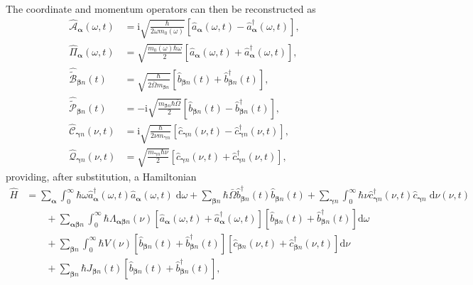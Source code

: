 \documentclass{article}
\begin{document}
The coordinate and momentum operators can then be reconstructed as
\begin{equation}
\begin{split}
\hat{\mathcal{A}}_{\bm{\alpha}}(\omega,t) &= \mathrm{i}\sqrt{\frac{\hbar}{2\omega m_0(\omega)}}\left[\hat{a}_{\bm{\alpha}}(\omega,t) - \hat{a}_{\bm{\alpha}}^\dagger(\omega,t)\right],\\
\hat{\mathit{\Pi}}_{\bm{\alpha}}(\omega,t) &= \sqrt{\frac{m_0(\omega)\hbar\omega}{2}}\left[\hat{a}_{\bm{\alpha}}(\omega,t) + \hat{a}_{\bm{\alpha}}^\dagger(\omega,t)\right],\\[0.5em]
\hat{\tilde{\mathcal{B}}}_{\bm{\beta}n}(t) &= \sqrt{\frac{\hbar}{2\bar{\Omega}m_{\bm{\beta}n}}}\left[\hat{b}_{\bm{\beta}n}(t) + \hat{b}_{\bm{\beta}n}^\dagger(t)\right],\\
\hat{\tilde{\mathcal{P}}}_{\bm{\beta}n}(t) &= -\mathrm{i}\sqrt{\frac{m_{\bm{\beta}n}\hbar\bar{\Omega}}{2}}\left[\hat{b}_{\bm{\beta}n}(t) - \hat{b}_{\bm{\beta}n}^\dagger(t)\right],\\[0.5em]
\hat{\mathcal{C}}_{\bm{\gamma}n}(\nu,t) &= \mathrm{i}\sqrt{\frac{\hbar}{2\nu m_{\bm{\gamma}n}}}\left[\hat{c}_{\bm{\gamma}n}(\nu,t) - \hat{c}_{\bm{\gamma}n}^\dagger(\nu,t)\right],\\
\hat{\mathcal{Q}}_{\bm{\gamma}n}(\nu,t) &= \sqrt{\frac{m_{\bm{\gamma}n}\hbar\nu}{2}}\left[\hat{c}_{\bm{\gamma}n}(\nu,t) + \hat{c}_{\bm{\gamma}n}^\dagger(\nu,t)\right],
\end{split}
\end{equation}
providing, after substitution, a Hamiltonian
\begin{equation}
\begin{split}
\hat{H} &= \sum_{\bm{\alpha}}\int_0^\infty\hbar\omega\hat{a}_{\bm{\alpha}}^\dagger(\omega,t)\hat{a}_{\bm{\alpha}}(\omega,t)\;\mathrm{d}\omega + \sum_{\bm{\beta}n}\hbar\bar{\Omega}\hat{b}_{\bm{\beta}n}^\dagger(t)\hat{b}_{\bm{\beta}n}(t) + \sum_{\bm{\gamma}n}\int_0^\infty\hbar\nu\hat{c}_{\bm{\gamma}n}^\dagger(\nu,t)\hat{c}_{\bm{\gamma}n}\;\mathrm{d}\nu(\nu,t)\\
&\qquad + \sum_{\bm{\alpha}\bm{\beta}n}\int_0^\infty\hbar\Lambda_{\bm{\alpha}\bm{\beta}n}(\nu)\left[\hat{a}_{\bm{\alpha}}(\omega,t) + \hat{a}_{\bm{\alpha}}^\dagger(\omega,t)\right]\left[\hat{b}_{\bm{\beta}n}(t) + \hat{b}_{\bm{\beta}n}^\dagger(t)\right]\mathrm{d}\omega\\
&\qquad + \sum_{\bm{\beta}n}\int_0^\infty\hbar V(\nu)\left[\hat{b}_{\bm{\beta}n}(t) + \hat{b}_{\bm{\beta}n}^\dagger(t)\right]\left[\hat{c}_{\bm{\beta}n}(\nu,t) + \hat{c}_{\bm{\beta}n}^\dagger(\nu,t)\right]\mathrm{d}\nu\\
&\qquad + \sum_{\bm{\beta}n}\hbar J_{\bm{\beta}n}(t)\left[\hat{b}_{\bm{\beta}n}(t) + \hat{b}_{\bm{\beta}n}^\dagger(t)\right],
\end{split}
\end{equation}
\end{document}
